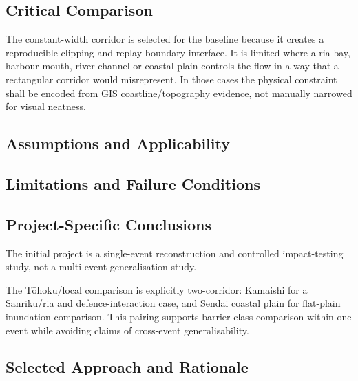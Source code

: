 \subsection{Critical Comparison}
\label{sec:res-dat-scn-critical-comparison}


The constant-width corridor is selected for the baseline because it
creates a reproducible clipping and replay-boundary interface. It is
limited where a ria bay, harbour mouth, river channel or coastal plain
controls the flow in a way that a rectangular corridor would
misrepresent. In those cases the physical constraint shall be encoded
from GIS coastline/topography evidence, not manually narrowed for
visual neatness.

\subsection{Assumptions and Applicability}
\label{sec:res-dat-scn-assumptions}


\subsection{Limitations and Failure Conditions}
\label{sec:res-dat-scn-limitations}


\subsection{Project-Specific Conclusions}
\label{sec:res-dat-scn-conclusions}

The initial project is a single-event reconstruction and controlled
impact-testing study, not a multi-event generalisation study.

The Tōhoku/local comparison is explicitly two-corridor: Kamaishi for a
Sanriku/ria and defence-interaction case, and Sendai coastal plain for
flat-plain inundation comparison. This pairing supports barrier-class
comparison within one event while avoiding claims of cross-event
generalisability.

\subsection{Selected Approach and Rationale}
\label{sec:res-dat-scn-selected-approach}

